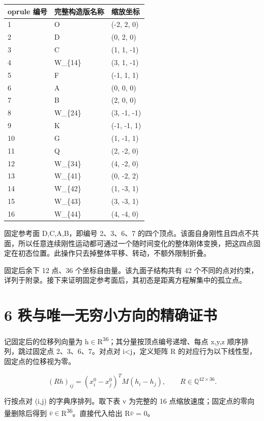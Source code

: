 \documentclass[UTF8,a4paper,11pt]{ctexart}
\begin{document}
\begin{longtable}{lll}	oprule
编号 & 完整构造版名称 & 缩放坐标 \\ \midrule
1 & O & (-2, 2, 0) \\
2 & D & (0, 2, 0) \\
3 & C & (1, 1, -1) \\
4 & W\_\{14\} & (3, 1, -1) \\
5 & F & (-1, 1, 1) \\
6 & A & (0, 0, 0) \\
7 & B & (2, 0, 0) \\
8 & W\_\{24\} & (3, -1, -1) \\
9 & K & (-1, -1, 1) \\
10 & G & (1, -1, 1) \\
11 & Q & (2, -2, 0) \\
12 & W\_\{34\} & (4, -2, 0) \\
13 & W\_\{41\} & (0, -2, 2) \\
14 & W\_\{42\} & (1, -3, 1) \\
15 & W\_\{43\} & (3, -3, 1) \\
16 & W\_\{44\} & (4, -4, 0) \\
\bottomrule\end{longtable}
固定参考面 D,C,A,B，即编号 2、3、6、7 的四个顶点。该面自身刚性且四点不共面，所以任意连续刚性运动都可通过一个随时间变化的整体刚体变换，把这四点固定在初态位置。此操作只去掉整体平移、转动，不额外限制折叠。

固定后余下 12 点、36 个坐标自由量。该九面子结构共有 42 个不同的点对约束，详列于附录。接下来证明固定参考面后，其初态是距离方程解集中的孤立点。

\newpage
\section*{6  秩与唯一无穷小方向的精确证书}
记固定后的位移列向量为 h\(\in\)R\textsuperscript{36}；其分量按顶点编号递增、每点 x,y,z 顺序排列，跳过固定点 2、3、6、7。对点对 i<j，定义矩阵 R 的对应行为以下线性型，固定点的位移视为零。


\[
(Rh)_{ij}=(x_i^0-x_j^0)^TM(h_i-h_j),\qquad R\in\mathbb{Q}^{42\times36}.
\]

行按点对 (i,j) 的字典序排列。取下表 v 为完整的 16 点缩放速度；固定点的零向量删除后得到 \(\bar v\)\(\in\)R\textsuperscript{36}。直接代入给出 R\(\bar v\) = 0。
\end{document}

